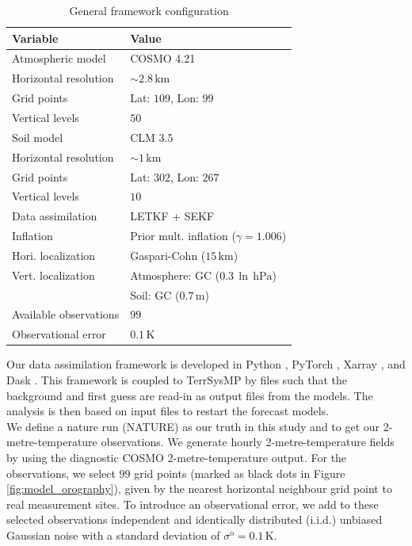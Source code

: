 \documentclass[hess, manuscript]{copernicus}
\begin{document}
\begin{table}[h]
	\caption{General framework configuration\label{tab:model_config}}
	\begin{tabular}{l|l}
		Variable & Value \\ 
		\hline 
		Atmospheric model & COSMO 4.21 \\
		Horizontal resolution & $\sim 2.8\,\text{km}$\\
		Grid points & Lat: $109$, Lon: $99$\\
		Vertical levels & $50$\\
		\hline
		Soil model & CLM 3.5\\
		Horizontal resolution & $\sim 1\,\text{km}$\\
		Grid points & Lat: $302$, Lon: $267$\\
		Vertical levels & $10$\\
		\hline
		Data assimilation & LETKF + SEKF\\
		Inflation & Prior mult. inflation ($\gamma = 1.006$)\\
		Hori. localization & Gaspari-Cohn ($15\,\text{km}$)\\
		Vert. localization & Atmosphere: GC ($0.3\,\ln\,\text{hPa}$)\\
		& Soil: GC ($0.7\,\text{m}$)\\
		Available observations & $99$\\
		Observational error & $0.1\,\text{K}$		
	\end{tabular}
\end{table}

Our data assimilation framework \citep{finn_py_bacy_2020, finn_torch-assimilate_2020} is developed in Python \citep{van_rossum_python_1995}, PyTorch \citep{paszke_pytorch_2019}, Xarray \citep{hoyer_xarray_2017}, and Dask \citep{dask_development_team_dask_2016,rocklin_dask_2015}.
This framework is coupled to TerrSysMP by files such that the background and first guess are read-in as output files from the models.
The analysis is then based on input files to restart the forecast models.\\

We define a nature run (NATURE) as our truth in this study and to get our 2-metre-temperature observations.
We generate hourly 2-metre-temperature fields by using the diagnostic COSMO 2-metre-temperature output. For the observations, we select $99$ grid points (marked as black dots in Figure \ref{fig:model_orography}), given by the nearest horizontal neighbour grid point to real measurement sites.
To introduce an observational error, we add to these selected observations independent and identically distributed (i.i.d.) unbiased Gaussian noise with a standard deviation of $\sigma^\text{o} = 0.1\,\text{K}$.
\end{document}
